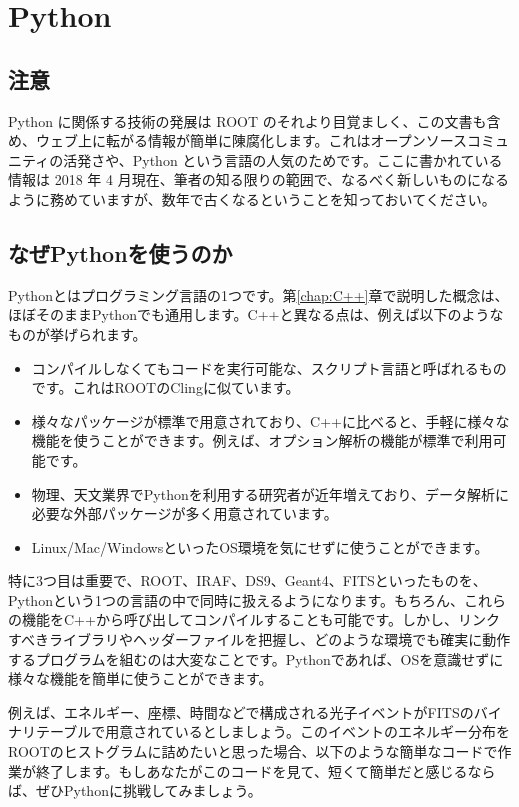 \chapter{Python}
\label{chap:Python}

\section{注意}
Python に関係する技術の発展は ROOT のそれより目覚ましく、この文書も含め、ウェブ上に転がる情報が簡単に陳腐化します。これはオープンソースコミュニティの活発さや、Python という言語の人気のためです。ここに書かれている情報は 2018 年 4 月現在、筆者の知る限りの範囲で、なるべく新しいものになるように務めていますが、数年で古くなるということを知っておいてください。

\section{なぜPythonを使うのか}

Pythonとはプログラミング言語の1つです。第\ref{chap:C++}章で説明した概念は、ほぼそのままPythonでも通用します。C++と異なる点は、例えば以下のようなものが挙げられます。
\begin{itemize}
  \item コンパイルしなくてもコードを実行可能な、スクリプト言語と呼ばれるものです。これはROOTのClingに似ています。
  \item 様々なパッケージが標準で用意されており、C++に比べると、手軽に様々な機能を使うことができます。例えば、オプション解析の機能が標準で利用可能です。
  \item 物理、天文業界でPythonを利用する研究者が近年増えており、データ解析に必要な外部パッケージが多く用意されています。
  \item Linux/Mac/WindowsといったOS環境を気にせずに使うことができます。
\end{itemize}
特に3つ目は重要で、ROOT、IRAF、DS9、Geant4、FITSといったものを、Pythonという1つの言語の中で同時に扱えるようになります。もちろん、これらの機能をC++から呼び出してコンパイルすることも可能です。しかし、リンクすべきライブラリやヘッダーファイルを把握し、どのような環境でも確実に動作するプログラムを組むのは大変なことです。Pythonであれば、OSを意識せずに様々な機能を簡単に使うことができます。

例えば、エネルギー、座標、時間などで構成される光子イベントがFITSのバイナリテーブルで用意されているとしましょう。このイベントのエネルギー分布をROOTのヒストグラムに詰めたいと思った場合、以下のような簡単なコードで作業が終了します。もしあなたがこのコードを見て、短くて簡単だと感じるならば、ぜひPythonに挑戦してみましょう。

